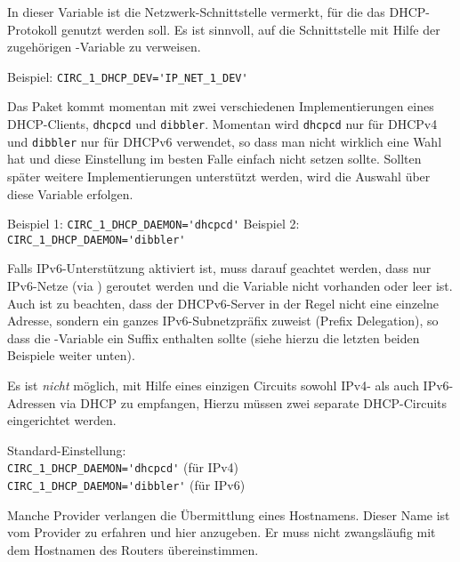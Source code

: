 \begin{description}


In dieser Variable ist die Netzwerk-Schnittstelle vermerkt, für die das
DHCP-Protokoll genutzt werden soll. Es ist sinnvoll, auf die Schnittstelle mit
Hilfe der zugehörigen -Variable zu verweisen.

Beispiel: \verb+CIRC_1_DHCP_DEV='IP_NET_1_DEV'+


Das Paket kommt momentan mit zwei verschiedenen Implementierungen eines
DHCP-Clients, \texttt{dhcpcd} und \texttt{dibbler}. Momentan wird
\texttt{dhcpcd} nur für DHCPv4 und \texttt{dibbler} nur für DHCPv6 verwendet,
so dass man nicht wirklich eine Wahl hat und diese Einstellung im besten Falle
einfach nicht setzen sollte. Sollten später weitere Implementierungen
unterstützt werden, wird die Auswahl über diese Variable erfolgen.

Beispiel 1: \verb+CIRC_1_DHCP_DAEMON='dhcpcd'+
Beispiel 2: \verb+CIRC_1_DHCP_DAEMON='dibbler'+

Falls IPv6-Unterstützung aktiviert ist, muss darauf geachtet werden, dass nur
IPv6-Netze (via ) geroutet werden und die Variable
 nicht vorhanden oder leer ist. Auch ist zu beachten,
dass der DHCPv6-Server in der Regel nicht eine einzelne Adresse, sondern ein
ganzes IPv6-Subnetzpräfix zuweist (Prefix Delegation), so dass die
-Variable ein Suffix enthalten sollte (siehe hierzu die
letzten beiden Beispiele weiter unten).

Es ist \emph{nicht} möglich, mit Hilfe eines einzigen Circuits sowohl IPv4-
als auch IPv6-Adressen via DHCP zu empfangen, Hierzu müssen zwei separate
DHCP-Circuits eingerichtet werden.

Standard-Einstellung:\\
\verb+CIRC_1_DHCP_DAEMON='dhcpcd'+ (für IPv4)\\
\verb+CIRC_1_DHCP_DAEMON='dibbler'+ (für IPv6)


Manche Provider verlangen die Übermittlung eines Hostnamens. Dieser Name ist
vom Provider zu erfahren und hier anzugeben. Er muss nicht zwangsläufig mit dem
Hostnamen des Routers übereinstimmen.


\end{description}
